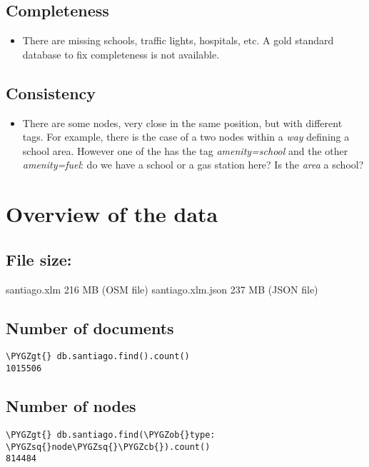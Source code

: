 \documentclass[a4paper,10pt,english]{sphinxhowto}
\def\PYGZob{\char`\{}
\def\PYGZcb{\char`\}}
\def\PYGZgt{\char`\>}
\def\PYGZsq{\char`\'}
\renewcommand\PYGZsq{\textquotesingle}
\begin{document}
\subsection{Completeness}
\label{index:completeness}\begin{itemize}
\item {} 
There are missing schools, traffic lights, hospitals, etc. A gold standard
database to fix completeness is not available.

\end{itemize}


\subsection{Consistency}
\label{index:consistency}\begin{itemize}
\item {} 
There are some nodes, very close in the same position, but with different tags.
For example, there is the case of a two nodes within a \emph{way} defining a school
area. However one of the has the tag \emph{amenity=school} and the other
\emph{amenity=fuel}: do we have a school or a gas station here? Is the \emph{area} a
school?

\end{itemize}


\section{Overview of the data}
\label{index:overview-of-the-data}

\subsection{File size:}
\label{index:file-size}
santiago.xlm            216 MB (OSM file)
santiago.xlm.json       237 MB (JSON file)


\subsection{Number of documents}
\label{index:number-of-documents}
\begin{Verbatim}[commandchars=\\\{\}]
\PYGZgt{} db.santiago.find().count()
1015506
\end{Verbatim}


\subsection{Number of nodes}
\label{index:number-of-nodes}
\begin{Verbatim}[commandchars=\\\{\}]
\PYGZgt{} db.santiago.find(\PYGZob{}type: \PYGZsq{}node\PYGZsq{}\PYGZcb{}).count()
814484
\end{Verbatim}
\end{document}
